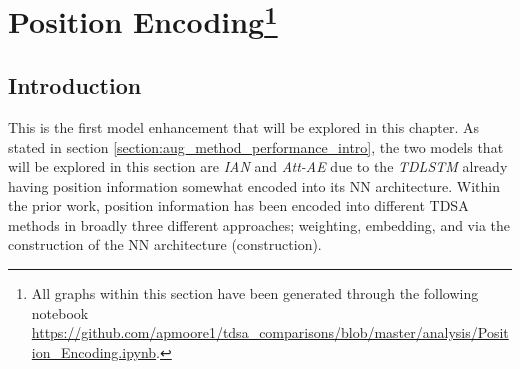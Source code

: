\section[Position Encoding]{Position Encoding\footnote{All graphs within this section have been generated through the following notebook \url{https://github.com/apmoore1/tdsa_comparisons/blob/master/analysis/Position_Encoding.ipynb}.}}
\label{section:aug_position_encoding}
\subsection{Introduction}
This is the first model enhancement that will be explored in this chapter. As stated in section \ref{section:aug_method_performance_intro}, the two models that will be explored in this section are \textit{IAN} and \textit{Att-AE} due to the \textit{TDLSTM} already having position information somewhat encoded into its NN architecture. Within the prior work, position information has been encoded into different TDSA methods in broadly three different approaches; weighting, embedding, and via the construction of the NN architecture (construction). 

